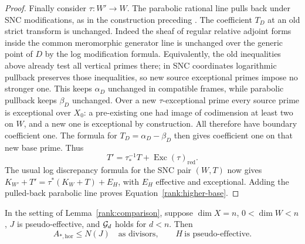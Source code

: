\begin{proof}
Finally consider \(\tau:W'\to W\).  The parabolic rational line pulls
back under SNC modifications, as in the construction preceding
\cite[Theorem~3.1]{CI}.  The coefficient \(T_D\) at an old strict
transform is unchanged.  Indeed the sheaf of regular relative
adjoint forms inside the common meromorphic generator line is
unchanged over the generic point of \(D\) by the log modification
formula.  Equivalently, the old inequalities above already test all
vertical primes there; in SNC coordinates logarithmic pullback
preserves those inequalities, so new source exceptional primes
impose no stronger one.  This keeps \(\alpha_D\) unchanged in
compatible frames, while parabolic pullback keeps \(\beta_D\)
unchanged.  Over a new \(\tau\)-exceptional prime every source prime
is exceptional over \(X_0\): a pre-existing one had image of
codimension at least two on \(W\), and a new one is exceptional
by construction.  All therefore have boundary coefficient one.
The formula for \(T_D=\alpha_D-\beta_D\) then gives coefficient one
on that new base prime.  Thus
\[
      T'=\tau_*^{-1}T+\operatorname{Exc}(\tau)_{\mathrm{red}}.
\]
The usual log discrepancy formula for the SNC pair \((W,T)\)
now gives \(K_{W'}+T'=\tau^*(K_W+T)+E_H\), with \(E_H\)
effective and exceptional.  Adding the pulled-back parabolic line
proves Equation~\eqref{rank:higher-base}.
\end{proof}

\begin{lemma}
\label{rank:base-psef}
In the setting of Lemma~\ref{rank:comparison}, suppose
\(\dim X=n\), \(0<\dim W<n\), \(J\) is pseudo-effective, and
\(\mathcal G_d\) holds for \(d<n\).  Then
\[
        A_{*,\mathrm{hor}}\leq N(J)
        \quad\text{as divisors},\qquad H\ \text{is pseudo-effective}.
\]
\end{lemma}

